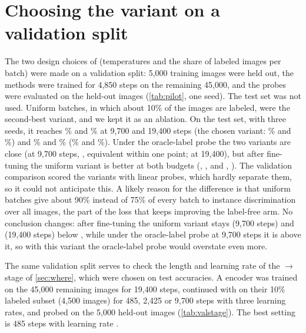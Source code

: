 \section{Choosing the \union variant on a validation split}
\label{app:pilot}
The two design choices of \union (temperatures and the share of labeled images per batch) were made on a
validation split: 5,000 training images were held out, the methods were trained for 4,850 steps on the
remaining 45,000, and the probes were evaluated on the held-out images (\cref{tab:pilot}, one seed). The
test set was not used. Uniform batches, in which about 10\% of the images are labeled, were the second-best
variant, and we kept it as an ablation. On the test set, with three seeds, it reaches \%
and \% \lpall at 9,700 and 19,400 steps (the chosen variant:
\% and \%) and \% and
\% \ftfive (\% and \%). Under the
oracle-label probe the two variants are close (\pt at 9,700 steps,
, equivalent within one point; \pt at
19,400), but after fine-tuning the uniform variant is better at both budgets
(\pt, , and
\pt, ). The validation comparison scored the
variants with linear probes, which hardly separate them, so it could not anticipate this. A likely reason for the
difference is that uniform batches give about 90\% instead of 75\% of every batch to instance discrimination over
all images, the part of the loss that keeps improving the label-free arm. No conclusion changes: after fine-tuning
the uniform variant stays \pt (9,700 steps) and \pt
(19,400 steps) below \simclr, while under the oracle-label probe at 9,700 steps it is
\pt above it, so with this variant the oracle-label probe would overstate
\union even more.

The same validation split serves to check the length and learning rate of the \simclr{}$\to$\supcon stage of
\cref{sec:where}, which were chosen on test accuracies. A \simclr encoder was
trained on the 45,000 remaining images for 19,400 steps, continued with \supcon on their 10\% labeled subset (4,500
images) for 485, 2,425 or 9,700 steps with three learning rates, and probed on the 5,000 held-out images
(\cref{tab:valstage}). The best setting is 485 steps with learning rate .

